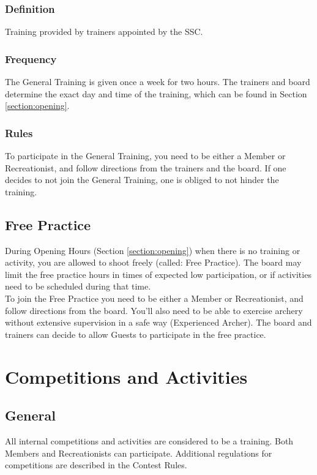 \documentclass[a4paper]{article}
\newcommand{\Awr}{Contest Rules} %
\begin{document}
\subsubsection{Definition}
Training provided by trainers appointed by the SSC.

\subsubsection{Frequency}
The General Training is given once a week for two hours. The trainers and board determine the exact day and time of the training, which can be found in Section \ref{section:opening}.

\subsubsection{Rules}
To participate in the General Training, you need to be either a Member or Recreationist, and follow directions from the trainers and the board. If one decides to not join the General Training, one is obliged to not hinder the training. 

\subsection{Free Practice}
During Opening Hours (Section \ref{section:opening}) when there is no training or activity, you are allowed to shoot freely (called: Free Practice). The board may limit the free practice hours in times of expected low participation, or if activities need to be scheduled during that time. \\

To join the Free Practice you need to be either a Member or Recreationist, and follow directions from the board. You'll also need to be able to exercise archery without extensive supervision in a safe way (Experienced Archer). The board and trainers can decide to allow Guests to participate in the free practice.

\section{Competitions and Activities}
\subsection{General}
All internal competitions and activities are considered to be a training. Both Members and Recreationists can participate. Additional regulations for competitions are described in the \Awr .
\end{document}
